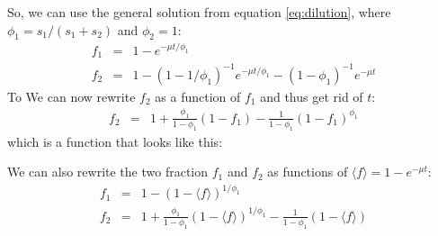 \documentclass{article}
\newcommand{\fin}{\ensuremath{\langle f \rangle}}
\begin{document}
So, we can use the general solution from equation \ref{eq:dilution}, where $\phi_1 = s_1 / (s_1 + s_2)$ and $\phi_2 = 1$:
\begin{eqnarray}
    f_1 &=& 1 - e^{- \mu t / \phi_1} \\
    f_2 &=& 1 - \left(1 - 1 / \phi_1 \right)^{-1} e^{- \mu t / \phi_1} - \left(1 - \phi_1 \right)^{-1} e^{- \mu t}
\end{eqnarray}
To We can now rewrite $f_2$ as a function of $f_1$ and thus get rid of $t$:
\begin{eqnarray}
    f_2 &=& 1 + \frac{\phi_1}{1-\phi_1} (1 - f_1) - \frac{1}{1-\phi_1} (1 - f_1)^{\phi_1}
\end{eqnarray}
which is a function that looks like this:
\begin{center}
\end{center}

We can also rewrite the two fraction $f_1$ and $f_2$ as functions of $\fin = 1 - e^{- \mu t}$:
\begin{eqnarray}
    f_1 &=& 1 - (1 - \fin)^{1/{\phi_1}} \label{eq:two_step_f1_vs_ftot} \nonumber\\
    f_2 &=& 1 + \frac{\phi_1}{1-\phi_1} (1 - \fin)^{1/{\phi_1}} - \frac{1}{1-\phi_1} (1 - \fin) \label{eq:two_step_f2_vs_ftot}
\end{eqnarray}
\end{document}
